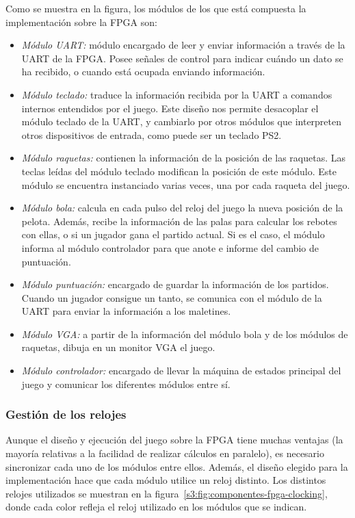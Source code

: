 Como se muestra en la figura, los módulos de los que está compuesta la
implementación sobre la FPGA son:
\begin{itemize}
\item \emph{Módulo UART:} módulo encargado de leer y enviar información a
  través de la UART de la FPGA. Posee señales de control para indicar
  cuándo un dato se ha recibido, o cuando está ocupada enviando
  información.
\item \emph{Módulo teclado:} traduce la información recibida por la UART a
  comandos internos entendidos por el juego. Este diseño nos permite
  desacoplar el módulo teclado de la UART, y cambiarlo por otros módulos
  que interpreten otros dispositivos de entrada, como puede ser un teclado
  PS2.
\item \emph{Módulo raquetas:} contienen la información de la posición de
  las raquetas. Las teclas leídas del módulo teclado modifican la posición
  de este módulo. Este módulo se encuentra instanciado varias veces, una
  por cada raqueta del juego.
\item \emph{Módulo bola:} calcula en cada pulso del reloj del juego la
  nueva posición de la pelota. Además, recibe la información de las palas
  para calcular los rebotes con ellas, o si un jugador gana el partido
  actual. Si es el caso, el módulo informa al módulo controlador para que
  anote e informe del cambio de puntuación.
\item \emph{Módulo puntuación:} encargado de guardar la información de los
  partidos. Cuando un jugador consigue un tanto, se comunica con el módulo
  de la UART para enviar la información a los maletines.
\item \emph{Módulo VGA:} a partir de la información del módulo bola y de
  los módulos de raquetas, dibuja en un monitor VGA el juego.
\item \emph{Módulo controlador:} encargado de llevar la máquina de estados
  principal del juego y comunicar los diferentes módulos entre sí.
\end{itemize}

\subsubsection{Gestión de los relojes}
\label{s3:subsubsec:clocking}
Aunque el diseño y ejecución del juego sobre la FPGA tiene muchas ventajas
(la mayoría relativas a la facilidad de realizar cálculos en paralelo), es
necesario sincronizar cada uno de los módulos entre ellos. Además, el
diseño elegido para la implementación hace que cada módulo utilice un reloj
distinto. Los distintos relojes utilizados se muestran en la
figura~\ref{s3:fig:componentes-fpga-clocking}, donde cada color refleja el
reloj utilizado en los módulos que se indican.

